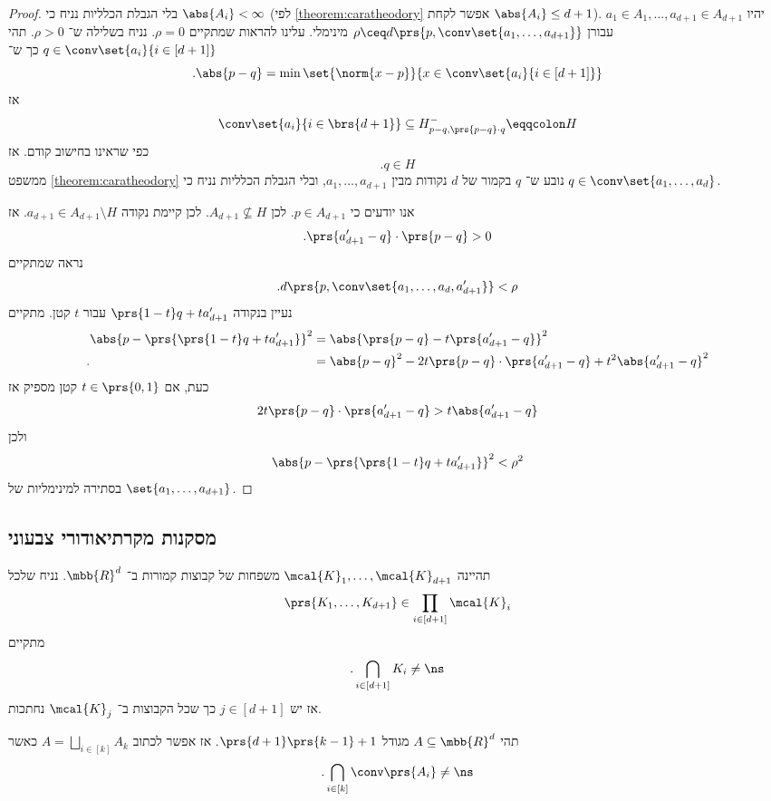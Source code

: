 \documentclass[a4paper,10pt,twoside,openany]{book}
\begin{document}
\begin{proof}
בלי הגבלת הכלליות נניח כי
$\abs{A_i} < \infty$
(לפי \ref{theorem:caratheodory} אפשר לקחת
$\abs{A_i} \leq d+1$).
יהיו
$a_1 \in A_1, \ldots, a_{d+1} \in A_{d+1}$
עבורן
$\rho \ceq d\prs{p, \conv\set{a_1, \ldots, a_{d+1}}}$
מינימלי.
עלינו להראות שמתקיים
$\rho = 0$.
נניח בשלילה ש־%
$\rho > 0$.
תהי
$q \in \conv\set{a_i}{i \in [d+1]}$
כך ש־%
\[\text{.} \abs{p-q} = \min\set{\norm{x-p}}{x \in \conv\set{a_i}{i \in [d+1]}}\]
אז
\[\conv\set{a_i}{i \in \brs{d+1}} \subseteq H_{p-q, \prs{p-q} \cdot q}^- \eqqcolon H\]
כפי שראינו בחישוב קודם.
אז
\[\text{.} q \in H\]
ממשפט
\ref{theorem:caratheodory}
נובע ש־%
$q$
בקמור של
$d$
נקודות מבין
$a_1, \ldots, a_{d+1}$,
ובלי הגבלת הכלליות נניח כי
$q \in \conv\set{a_1, \ldots, a_d}$.

אנו יודעים כי
$p \in A_{d+1}$.
לכן
$A_{d+1} \nsubseteq H$.
לכן קיימת נקודה
$a_{d+1} \in A_{d+1} \setminus H$.
אז
\[\text{.} \prs{a_{d+1}' - q} \cdot \prs{p-q} > 0\]
נראה שמתקיים
\[\text{.} d\prs{p, \conv\set{a_1, \ldots, a_d, a_{d+1}'}} < \rho\]
נעיין בנקודה
$\prs{1-t}q + t a_{d+1}'$
עבור
$t$
קטן.
מתקיים
\begin{align*}
\abs{p - \prs{\prs{1-t} q + ta_{d+1}'}}^2 &= \abs{\prs{p-q} - t \prs{a_{d+1}' - q}}^2
\\ \text{.} \hphantom{\abs{p - \prs{\prs{1-t} q + ta_{d+1}'}}^2} &= \abs{p-q}^2 - 2t \prs{p-q} \cdot \prs{a_{d+1}' - q} + t^2 \abs{a_{d+1}' - q}^2
\end{align*}
כעת, אם
$t \in \prs{0,1}$
קטן מספיק
אז
\[2t \prs{p-q} \cdot \prs{a_{d+1}' - q} > t \abs{a_{d+1}' - q}\]
ולכן
\[\abs{p - \prs{\prs{1-t} q + ta_{d+1}'}}^2 < \rho^2\]
בסתירה למינימליות של
$\set{a_1, \ldots, a_{d+1}}$.
\end{proof}

\subsection{מסקנות מקרתיאודורי צבעוני}

\begin{theorem} \label{theorem:colourful-helly}
תהיינה
$\mcal{K}_1, \ldots, \mcal{K}_{d+1}$
משפחות של קבוצות קמורות ב־%
$\mbb{R}^d$.
נניח שלכל
\[\prs{K_1, \ldots, K_{d+1}} \in \prod_{i \in [d+1]} \mcal{K}_i\]
מתקיים
\[\text{.} \bigcap_{i \in [d+1]} K_i \neq \ns\]
אז יש
$j \in [d+1]$
כך שכל הקבוצות ב־%
$\mcal{K}_j$
נחתכות.
\end{theorem}

\begin{theorem}[טברברג]
תהי
$A \subseteq \mbb{R}^d$
מגודל
$\prs{d+1}\prs{k-1} + 1$.
אז אפשר לכתוב
$A = \bigsqcup_{i \in [k]} A_k$
כאשר
\[\text{.} \bigcap_{i \in [k]} \conv\prs{A_i} \neq \ns\]
\end{theorem}
\end{document}
